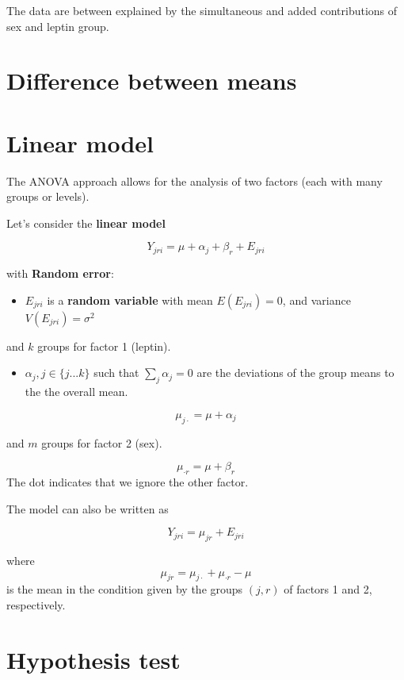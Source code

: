 \documentclass[
]{book}
\providecommand{\tightlist}{%
  \setlength{\itemsep}{0pt}\setlength{\parskip}{0pt}}
\begin{document}
The data are between explained by the simultaneous and added contributions of sex and leptin group.

\hypertarget{difference-between-means-3}{%
\section{Difference between means}\label{difference-between-means-3}}

\hypertarget{linear-model-1}{%
\section{Linear model}\label{linear-model-1}}

The ANOVA approach allows for the analysis of two factors (each with many groups or levels).

Let's consider the \textbf{linear model}

\[Y_{jri} = \mu + \alpha_j + \beta_r + E_{jri}\]

with \textbf{Random error}:

\begin{itemize}
\tightlist
\item
  \(E_{jri}\) is a \textbf{random variable} with mean \(E(E_{jri})=0\), and variance \(V(E_{jri})=\sigma^2\)
\end{itemize}

and \(k\) groups for factor 1 (leptin).

\begin{itemize}
\tightlist
\item
  \(\alpha_j, j \in\{j...k\}\) such that \(\sum_j \alpha_j=0\) are the deviations of the group means to the the overall mean.
\end{itemize}

\[\mu_{j\cdot}=\mu + \alpha_j\]

and \(m\) groups for factor 2 (sex).

\[\mu_{\cdot r}=\mu + \beta_r\]
The dot indicates that we ignore the other factor.

The model can also be written as

\[Y_{jri} = \mu_{jr} + E_{jri}\]

where \[\mu_{jr} = \mu_{j \cdot} + \mu_{\cdot r} - \mu\] is the mean in the condition given by the groups \((j,r)\) of factors 1 and 2, respectively.

\hypertarget{hypothesis-test-3}{%
\section{Hypothesis test}\label{hypothesis-test-3}}
\end{document}
